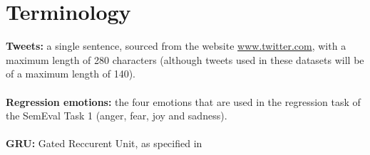 
\section*{Terminology}

\textbf{Tweets:} a single sentence, sourced from the website \href{www.twitter.com}{www.twitter.com}, with a maximum length of 280 characters (although tweets used in these datasets will be of a maximum length of 140).\\
\\
\textbf{Regression emotions:} the four emotions that are used in the regression task of the SemEval Task 1 (anger, fear, joy and sadness).\\
\\
\textbf{GRU:} Gated Reccurent Unit, as specified in \cite{chung}